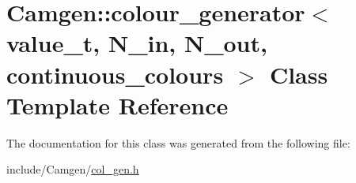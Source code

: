 \hypertarget{a00082}{\section{Camgen\-:\-:colour\-\_\-generator$<$ value\-\_\-t, N\-\_\-in, N\-\_\-out, continuous\-\_\-colours $>$ Class Template Reference}
\label{a00082}
}


The documentation for this class was generated from the following file\-:\begin{DoxyCompactItemize}
\item 
include/\-Camgen/\hyperlink{a00593}{col\-\_\-gen.\-h}\end{DoxyCompactItemize}
